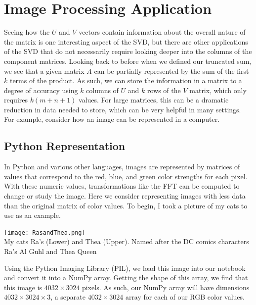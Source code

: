 \documentclass[letterpaper,12pt]{article}
\begin{document}
\section{Image Processing Application}
Seeing how the $U$ and $V$ vectors contain information about the overall nature of the matrix is one interesting aspect of the SVD, but there are other applications of the SVD that do not necessarily require looking deeper into the columns of the component matrices. Looking back to before when we defined our truncated sum, we see that a given matrix $A$ can be partially represented by the sum of the first $k$ terms of the product. As such, we can store the information in a matrix to a degree of accuracy using $k$ columns of $U$ and $k$ rows of the $V$ matrix, which only requires $k(m+n+1)$ values. For large matrices, this can be a dramatic reduction in data needed to store, which can be very helpful in many settings. For example, consider how an image can be represented in a computer.
\subsection{Python Representation}
In Python and various other languages, images are represented by matrices of values that correspond to the red, blue, and green color strengths for each pixel. With these numeric values, transformations like the FFT can be computed to change or study the image. Here we consider representing images with less data than the original matrix of color values. To begin, I took a picture of my cats to use as an example.
\begin{center}
\texttt{[image: RasandThea.png]}\\
My cats Ra's (Lower) and Thea (Upper). Named after the DC comics characters Ra's Al Guhl and Thea Queen
\end{center}
Using the Python Imaging Library (PIL), we load this image into our notebook and convert it into a NumPy array. Getting the shape of this array, we find that this image is $4032\times 3024$ pixels. As such, our NumPy array will have dimensions $4032\times 3024\times 3$, a separate $4032\times 3024$ array for each of our RGB color values.
\end{document}
